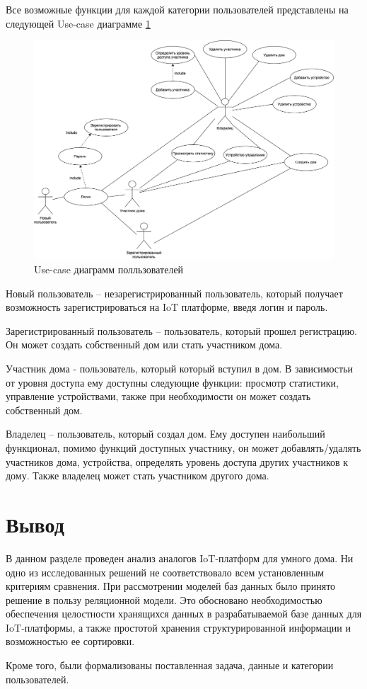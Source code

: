 Все возможные функции для каждой категории пользователей представлены на следующей Use-case диаграмме \ref{img:iot}
\begin{figure}[h]
    \includegraphics[width=0.9\linewidth]{img/iot.png}
    \caption{Use-case диаграмм полльзователей}
    \label{img:iot}
\end{figure}
\noindent

Новый пользователь -- незарегистрированный пользователь, который получает возможность зарегистрироваться 
на IoT платформе, введя логин и пароль. 

Зарегистрированный пользователь -- пользователь, который прошел регистрацию. Он может создать собственный дом или стать участником 
дома.

Участник дома - пользователь, который который вступил в дом. В зависимостьи от уровня доступа ему доступны следующие функции:
просмотр статистики, управление устройствами, также при необходимости он может создать собственный дом.

Владелец -- пользователь, который создал дом. Ему доступен наибольший функционал, помимо функций доступных участнику,
он может добавлять/удалять участников дома, устройства, определять уровень доступа других участников к дому. Также владелец 
может стать участником другого дома.

\section*{Вывод}

В данном разделе проведен анализ аналогов IoT-платформ для умного дома.
Ни одно из исследованных решений не соответствовало всем установленным критериям сравнения. 
При рассмотрении моделей баз данных было принято решение в пользу реляционной модели. 
Это обосновано необходимостью обеспечения целостности хранящихся данных в разрабатываемой базе данных 
для IoT-платформы, а также простотой хранения структурированной информации и возможностью ее сортировки.

Кроме того, были формализованы поставленная задача, данные и категории пользователей.
